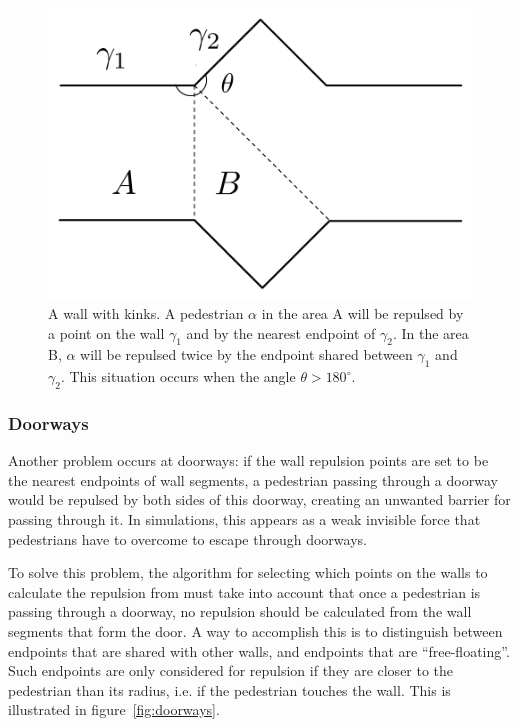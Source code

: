 \begin{figure}[h]
    \centering
    \includegraphics[scale=0.45]{Figures/WallCase.pdf} \caption[A wall with 
    kinks]{A wall with kinks. A pedestrian $\alpha$ in the area A will be 
    repulsed by a point on the wall $\gamma_1$ and by the nearest endpoint of 
    $\gamma_2$. In the area B, $\alpha$ will be repulsed twice by the endpoint 
    shared between $\gamma_1$ and $\gamma_2$. This situation occurs when the 
    angle $\theta > 180^\circ$.}
    \label{fig:wall-kinks}
\end{figure}

\subsubsection{Doorways}
Another problem occurs at doorways: if the wall repulsion points are set to be 
the nearest endpoints of wall segments, a pedestrian passing through a doorway 
would be repulsed by both sides of this doorway, creating an unwanted barrier 
for passing through it. In simulations, this appears as a weak invisible force 
that pedestrians have to overcome to escape through doorways.

To solve this problem, the algorithm for selecting which points on the walls 
to calculate the repulsion from must take into account that once a pedestrian 
is passing through a doorway, no repulsion should be calculated from the wall 
segments that form the door. A way to accomplish this is to distinguish 
between endpoints that are shared with other walls, and endpoints that are 
``free-floating''. Such endpoints are only considered for repulsion if they 
are closer to the pedestrian than its radius, i.e. if the pedestrian touches 
the wall. This is illustrated in figure~\ref{fig:doorways}.

